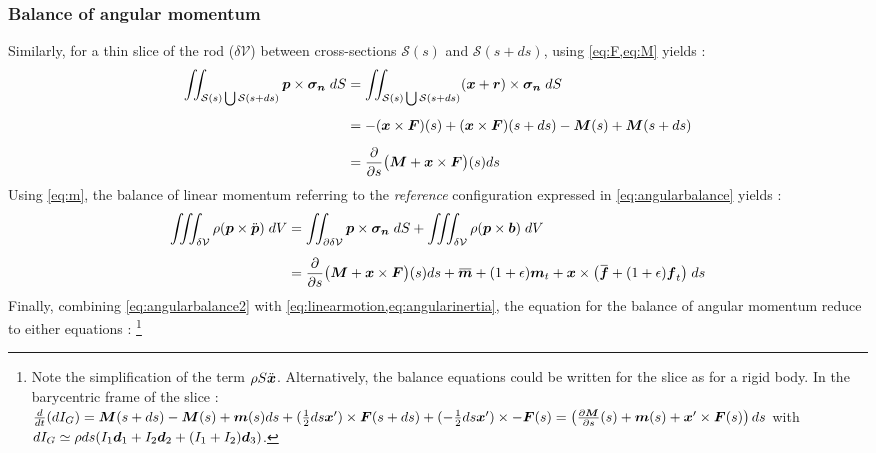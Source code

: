 \subsubsection{Balance of angular momentum}
Similarly, for a thin slice of the rod ($\delta\mathcal{V}$) between cross-sections $\mathcal{S}(s)$ and $\mathcal{S}(s+ds)$, using \cref{eq:F,eq:M} yields : 
\begin{equation}
	\begin{aligned}
		\iint_{\mathcal{S}(s) \bigcup \mathcal{S}(s+ds)} \boldsymbol{p} \times \boldsymbol{\sigma_n} \;dS
		&= \iint_{\mathcal{S}(s) \bigcup \mathcal{S}(s+ds)} (\boldsymbol{x} + \boldsymbol{r}) \times \boldsymbol{\sigma_n} \;dS
		\\[0.5em]
		&= -(\boldsymbol{x}\times\boldsymbol{F})(s) + (\boldsymbol{x}\times\boldsymbol{F})(s+ds) - \boldsymbol{M}(s) + \boldsymbol{M}(s+ds)
		\\[0.5em]
		&=  \frac{\partial}{\partial s} \big( \boldsymbol{M} + \boldsymbol{x}\times\boldsymbol{F} \big)(s) ds
	\end{aligned}
\end{equation}
Using \cref{eq:m}, the balance of linear momentum referring to the \emph{reference} configuration expressed in \cref{eq:angularbalance} yields : 
\begin{equation}
	\label{eq:angularbalance2}
	\begin{aligned}
		\iiint_{\delta\mathcal{V}} \rho (\vect{p} \times \ddot{\vect{p}}) \;dV  
		&=  \iint_{\partial\delta\mathcal{V}} \vect{p} \times \vect{\sigma_n} \;dS 
		+ \iiint_{\delta\mathcal{V}} \rho (\vect{p} \times \vect{b}) \;dV
		\\[0.5em]
		&= \frac{\partial}{\partial s} \big( \vect{M} + \vect{x}\times\vect{F} \big)(s) ds 
		+ \overbar{\vect{m}} + (1+\epsilon)\vect{m}_t + \vect{x} \times \big(\overbar{\vect{f}} + (1+\epsilon)\vect{f}_t \big) \;ds 
	\end{aligned}
\end{equation}
Finally, combining \cref{eq:angularbalance2} with \cref{eq:linearmotion,eq:angularinertia}, the equation for the balance of angular momentum reduce to either equations : \footnote{Note the simplification of the term $\rho S \ddot{\boldsymbol{x}}$. Alternatively, the balance equations could be written for the slice as for a rigid body. In the barycentric frame of the slice : $\frac{d}{dt}(dI_G) = \boldsymbol{M}(s+ds)-\boldsymbol{M}(s) + \boldsymbol{m}(s)ds + (\tfrac{1}{2}ds\boldsymbol{x}')\times \boldsymbol{F}(s+ds) + (-\tfrac{1}{2}ds\boldsymbol{x}')\times -\boldsymbol{F}(s) = \left(\frac{\partial \boldsymbol{M}}{\partial s}(s)+\boldsymbol{m}(s) + \boldsymbol{x}'\times \boldsymbol{F}(s)\right)ds$ with $dI_G \simeq \rho ds (I_1 \boldsymbol{d}_1 + I_2 \boldsymbol{d}_2 + (I_1+I_2) \boldsymbol{d}_3)$.}

